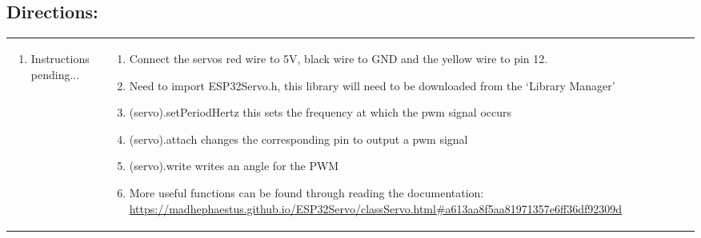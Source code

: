 \documentclass[a4paper,12pt]{report}
\begin{document}
    \subsection*{Directions:}
        \begin{center}
            \begin{tabularx}{\textwidth} { 
                | >{\raggedright\arraybackslash}X 
                | >{\raggedright\arraybackslash}X | }
                \hline
                \multicolumn{1}{|c|}{\textbf{Arduino}} & 
                \multicolumn{1}{|c|}{\textbf{ESP32}} \\
                \hline
                \begin{enumerate}
                    \item Instructions pending...
                \end{enumerate}  &
                \begin{enumerate}
                    \item Connect the servos red wire to 5V, black wire to GND and the yellow wire to pin 12.
                    \item Need to import ESP32Servo.h, this library will need to be downloaded from the ‘Library Manager’
                    \item (servo).setPeriodHertz this sets the frequency at which the pwm signal occurs
                    \item (servo).attach changes the corresponding pin to output a pwm signal
                    \item (servo).write writes an angle for the PWM 
                    \item More useful functions can be found through reading the documentation:
                            \url{https://madhephaestus.github.io/ESP32Servo/classServo.html#a613aa8f5aa81971357e6ff36df92309d}
                    
                \end{enumerate} \\
                \hline
            \end{tabularx}
            
        \end{center}
    \newpage
\end{document}
